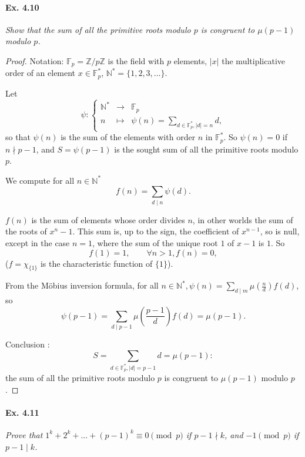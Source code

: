 \documentclass[11pt,a4paper]{article}
\newcommand{\Z}{\mathbb{Z}}
\newcommand{\N}{\mathbb{N}}
\newcommand{\F}{\mathbb{F}}
\begin{document}
\paragraph{Ex. 4.10}

{\it Show that the sum of all the primitive roots modulo $p$ is congruent to $\mu(p-1)$ modulo $p$.
}


\begin{proof}
Notation: $\F_p=\Z/p\Z$ is the field with $p$ elements, $\vert x \vert$ the multiplicative order of an element $x \in \F_p^*$, $\N^* = \{1,2,3,\ldots\}$.

Let
$$
\psi : 
\left\{
\begin{array}{ccc}
\N^*  & \to   &  \F_p \\
 n  &\mapsto   &  \psi(n) = \sum\limits_{d \in \F_p^*,\vert d \vert =n} d,   
\end{array}
\right.
$$
so that $\psi(n)$ is the sum of the elements  with order $n$ in $\F_p^*$. So $\psi(n) = 0$ if $n \nmid p-1$, and $S = \psi(p-1)$ is the sought sum of all the primitive roots modulo $p$.

We compute for all $n \in \N^*$
$$f(n) = \sum\limits_{d \mid n} \psi(d).$$

$f(n)$ is the sum of elements whose order divides $n$, in other worlds the sum of the roots of $x^n - 1$. This sum is, up to the sign, the coefficient of $x^{n-1}$, so is null, except in the case $n=1$, where the sum of the unique root $1$ of $x-1$ is $1$. So
$$f(1) = 1, \qquad \forall n > 1,f(n) = 0,$$
($f  = \chi_{\{1\}}$ is the characteristic function of $\{1\}$).

From the M\"{o}bius inversion formula, for all $n \in \N^*, \psi(n) = \sum_{d\mid m} \mu\left (\frac{n}{d}\right) f(d)$, so
$$\psi(p-1) =  \sum_{d\mid p-1} \mu\left (\frac{p-1}{d}\right) f(d) = \mu(p-1).$$

Conclusion : $$S = \sum\limits_{d \in \F_p^*,\vert d \vert =p-1} d = \mu(p-1) :$$ 
the sum of all the primitive roots modulo $p$ is congruent to $\mu(p-1)$ modulo $p$.
\end{proof}

\paragraph{Ex. 4.11}

{\it Prove that $1^k + 2^k + . . . + (p-1)^k \equiv 0 \pmod p$ if $p-1 \nmid k$, and $ -1 \pmod p$ if $p-1 \mid k$.
}
\end{document}
